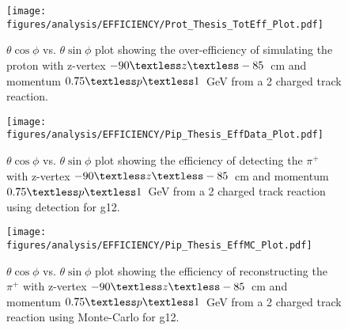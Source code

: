 \begin{figure}[h!]\begin{center}
		\texttt{[image: \\figures/analysis/EFFICIENCY/Prot\_Thesis\_TotEff\_Plot.pdf]}
		\caption[$\theta \cos\phi$ vs. $\theta \sin\phi$ plot showing the over-efficiency of simulating the proton with z-vertex $-90\textless z\textless-85$~cm and momentum $0.75\textless p \textless 1$~GeV from a 2 charged track reaction]{\label{fig:toteff_prot} $\theta \cos\phi$ vs. $\theta \sin\phi$ plot showing the over-efficiency of simulating the proton with z-vertex $-90\textless z\textless-85$~cm and momentum $0.75\textless p \textless 1$~GeV from a 2 charged track reaction.}
\end{center}\end{figure}
\begin{figure}[h!]\begin{center}
		\texttt{[image: \\figures/analysis/EFFICIENCY/Pip\_Thesis\_EffData\_Plot.pdf]}
		\caption[$\theta \cos\phi$ vs. $\theta \sin\phi$ plot showing the efficiency of detecting the $\pi^+$ with z-vertex $-90\textless z\textless-85$~cm and momentum $0.75\textless p \textless 1$~GeV from a 2 charged track reaction using  detection for g12]{\label{fig:eff_pip_data} $\theta \cos\phi$ vs. $\theta \sin\phi$ plot showing the efficiency of detecting the $\pi^+$ with z-vertex $-90\textless z\textless-85$~cm and momentum $0.75\textless p \textless 1$~GeV from a 2 charged track reaction using  detection for g12.}
\end{center}\end{figure}
\begin{figure}[h!]\begin{center}
		\texttt{[image: \\figures/analysis/EFFICIENCY/Pip\_Thesis\_EffMC\_Plot.pdf]}
		\caption[$\theta \cos\phi$ vs. $\theta \sin\phi$ plot showing the efficiency of reconstructing the $\pi^+$ with z-vertex $-90\textless z\textless-85$~cm and momentum $0.75\textless p \textless 1$~GeV from a 2 charged track reaction using  Monte-Carlo for g12]{\label{fig:eff_pip_MC} $\theta \cos\phi$ vs. $\theta \sin\phi$ plot showing the efficiency of reconstructing the $\pi^+$ with z-vertex $-90\textless z\textless-85$~cm and momentum $0.75\textless p \textless 1$~GeV from a 2 charged track reaction using  Monte-Carlo for g12.}
\end{center}\end{figure}
